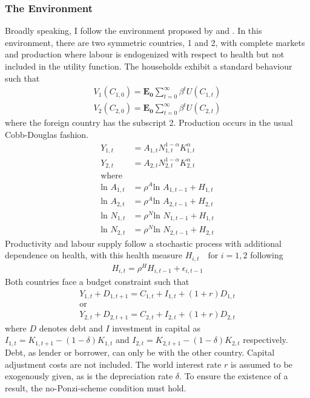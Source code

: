 \documentclass{article}
\begin{document}
\subsubsection{The Environment}

Broadly speaking, I follow the environment proposed by \cite{backus1992international} and \cite{kim2003spurious}. In this environment, there are two symmetric countries, 1 and 2, with complete markets and production where labour is endogenized with respect to health but not included in the utility function. The households exhibit a standard behaviour such that
\begin{align}
V_1 (C_{1, 0}) =\mathbf{E_0} \sum_{t=0}^{\infty} \beta^{t} U(C_{1, t}) \\
V_2 (C_{2, 0}) = \mathbf{E_0} \sum_{t=0}^{\infty} \beta^{t} U(C_{2, t})
\end{align} 
where the foreign country has the subscript 2. Production occurs in the usual Cobb-Douglas fashion.
\begin{align}
Y_{1, t} &= A_{1, t} N_{1, t}^{1-\alpha} K_{1, t}^{\alpha} \\
Y_{2, t} &= A_{2, t} N_{2, t}^{1-\alpha} K_{2, t}^{\alpha} \\
\text{where} \nonumber \\
\text{ln } A_{1, t} &= \rho^A \text{ln } A_{1, t-1} + H_{1, t} \\
\text{ln } A_{2, t} &= \rho^A \text{ln } A_{2, t-1} + H_{2, t} \\
\text{ln } N_{1, t} &= \rho^N \text{ln } N_{1, t-1} + H_{1, t} \\
\text{ln } N_{2, t} &= \rho^N \text{ln } N_{2, t-1} + H_{2, t}
\end{align}
Productivity and labour supply follow a stochastic process with additional dependence on health, with this health measure $H_{i, t} \text{  } \text{ for }  i= 1,2$ following 
\begin{align}
H_{i,t} = \rho^H H_{i, t-1} + \epsilon_{i, t-1}
\end{align}
Both countries face a budget constraint such that 
\begin{align}
Y_{1, t} + D_{1, t+1} = C_{1, t} + I_{1, t} + (1+r)D_{1, t} \\
\text{or} \nonumber \\
Y_{2, t} + D_{2, t+1} = C_{2, t} + I_{2, t} + (1+r)D_{2, t}
\end{align}
where $D$ denotes debt and $I$ investment in capital as $I_{1, t} = K_{1, t+1} - (1 - \delta)K_{1, t}$ and $I_{2, t} = K_{2, t+1} - (1 - \delta)K_{2, t}$ respectively. Debt, as lender or borrower, can only be with the other country. Capital adjustment costs are not included. The world interest rate $r$ is assumed to be exogenously given, as is the depreciation rate $\delta$. To ensure the existence of a result, the no-Ponzi-scheme condition must hold.
\end{document}
